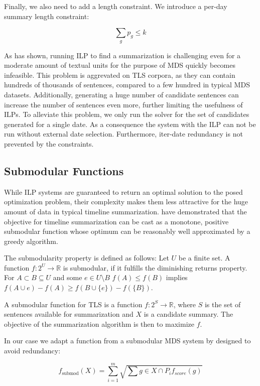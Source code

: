 \documentclass[a4paper,BCOR=10mm]{report}
\begin{document}
Finally, we also need to add a length constraint. We introduce a per-day summary length constraint:

\begin{displaymath}
\sum_{g} p_g \leq k
\end{displaymath}


As \citet{mcdonald} has shown, running ILP to find a summarization is challenging even for a moderate amount of textual units for the purpose of MDS quickly becomes infeasible.
This problem is aggrevated on TLS corpora, as they can contain hundreds of thousands of sentences, compared to a few hundred in typical MDS datasets. Additionally, generating a huge number of candidate sentences can increase the number of sentences even more, further limiting the usefulness of ILPs.
To alleviate this problem, we only run the solver for the set of candidates generated for a single date. As a consequence the system with the ILP can not be run without external date selection. Furthermore, iter-date redundancy is not prevented by the constraints.

\subsection{Submodular Functions}

While ILP systems are guaranteed to return an optimal solution to the posed optimization problem, their complexity makes them less attractive for the huge amount of data in typical timeline summarization. \citet{markert} have demonstrated that the objective for timeline summarization can be cast as a monotone, positive submodular function whose optimum can be reasonably well approximated by a greedy algorithm.

The submodularity property is defined as follows:
 Let $U$ be a finite set. A function $f: 2^{U} \rightarrow \mathbb{R}$ is submodular, if it fulfills the diminishing returns property. For $A \subset B \subseteq U$ and some $e \in U \setminus B$ $f(A) \leq f(B)$ implies $f(A \cup e) - f(A) \geq f(B \cup \{e\}) - f(\{B\})$.

A submodular function for TLS is a function $f: 2^{S} \rightarrow \mathbb{R}$, where $S$ is the set of sentences available for summarization and $X$ is a candidate summary.
The objective of the summarization algorithm is then to maximize $f$.

In our case we adapt a function from a submodular MDS system by \citet{lin+blimes} designed to avoid redundancy:

\begin{displaymath}
f_{\text{submod}}(X) = \sum_{i = 1}^{m} \sqrt{\sum{g \in X \cap P_i} f_{score}(g)}
\end{displaymath}
\end{document}
